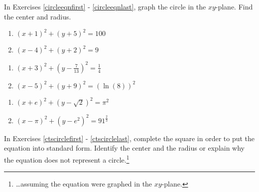 \documentclass{ximera}
\begin{document}
	\author{Stitz-Zeager}



\label{ExercisesforCircles}

In Exercises \ref{circleeqnfirst} - \ref{circleeqnlast}, graph the circle in the $xy$-plane.  Find the center and radius.

\begin{multicols}{2}
\begin{enumerate}

\item $(x + 1)^{2} + (y + 5)^{2} = 100$ \label{circleeqnfirst} \label{oddcircleone}
\item $(x-4)^2+(y+2)^2 = 9$

\setcounter{HW}{\value{enumi}}
\end{enumerate}
\end{multicols}

\begin{multicols}{2}
\begin{enumerate}
\setcounter{enumi}{\value{HW}}

\item $\left(x + 3\right)^{2} + \left(y - \frac{7}{13}\right)^{2} = \frac{1}{4}$ \label{oddcirclethree}

\item $(x - 5)^{2} + (y + 9)^{2} = (\ln(8))^{2}$


\setcounter{HW}{\value{enumi}}
\end{enumerate}
\end{multicols}

\begin{multicols}{2}
\begin{enumerate}
\setcounter{enumi}{\value{HW}}


\item $(x  + e)^{2} + \left(y - \sqrt{2} \right)^{2} = \pi^{2}$  \label{oddcirclefive}

\item $\left(x - \pi \right)^{2} + \left(y -  e^{2}\right)^{2} = 91^{\frac{2}{3}}$ \label{circleeqnlast}

\setcounter{HW}{\value{enumi}}
\end{enumerate}
\end{multicols}


In Exercises \ref{ctscirclefirst} - \ref{ctscirclelast}, complete the square in order to put the equation into standard form.  Identify the center and the radius or explain why the equation does not represent a circle.\footnote{\ldots assuming the equation were graphed in the $xy$-plane.}
\end{document}
